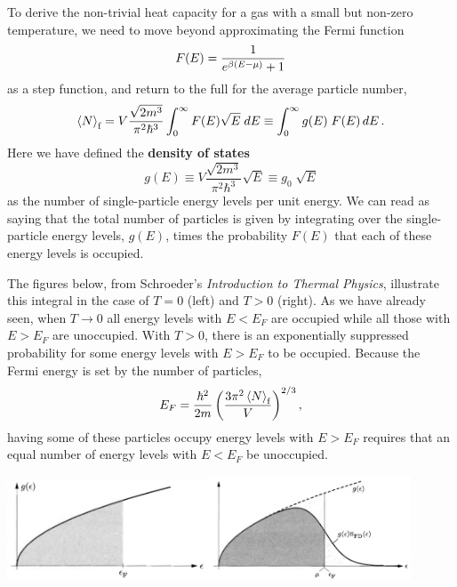 To derive the non-trivial heat capacity for a gas with a small but non-zero temperature, we need to move beyond approximating the Fermi function
\begin{equation*}
  F(E) = \frac{1}{e^{\beta(E - \mu)} + 1}
\end{equation*}
as a step function, and return to the full  for the average particle number,
\begin{equation}
  \label{eq:number}
  \left\langle N \right\rangle_{\text{f}} = V \frac{\sqrt{2m^3}}{\pi^2 \hbar^3} \int_0^{\infty} F(E) \sqrt{E} \; dE \equiv \int_0^{\infty} g(E) \; F(E) \mathop{dE}.
\end{equation}
Here we have defined the \textbf{density of states}
\begin{equation*}
  g(E) \equiv V \frac{\sqrt{2m^3}}{\pi^2 \hbar^3} \sqrt{E} \equiv g_0 \; \sqrt{E}
\end{equation*}
as the number of single-particle energy levels per unit energy.
We can read  as saying that the total number of particles is given by integrating over the single-particle energy levels, $g(E)$, times the probability $F(E)$ that each of these energy levels is occupied.

The figures below, from Schroeder's \textit{Introduction to Thermal Physics}, illustrate this integral in the case of $T = 0$ (left) and $T > 0$ (right).
As we have already seen, when $T \to 0$ all energy levels with $E < E_F$ are occupied while all those with $E > E_F$ are unoccupied.
With $T > 0$, there is an exponentially suppressed probability for some energy levels with $E > E_F$ to be occupied.
Because the Fermi energy is set by the number of particles,
\begin{equation*}
  E_F = \frac{\hbar^2}{2m}\left(\frac{3\pi^2 \left\langle N \right\rangle_{\text{f}}}{V}\right)^{2 / 3},
\end{equation*}
having some of these particles occupy energy levels with $E > E_F$ requires that an equal number of energy levels with $E < E_F$ be unoccupied.

\noindent\includegraphics[width=0.45\textwidth]{figs/unit08_zero.pdf}\hfill \includegraphics[width=0.45\textwidth]{figs/unit08_nonzero.pdf}


